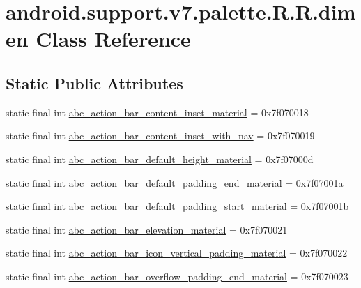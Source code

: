 \hypertarget{classandroid_1_1support_1_1v7_1_1palette_1_1_r_1_1dimen}{
\section{android.support.v7.palette.R.R.dimen Class Reference}
\label{classandroid_1_1support_1_1v7_1_1palette_1_1_r_1_1dimen}
}
\subsection*{Static Public Attributes}
\begin{CompactItemize}
\item 
static final int \hyperlink{classandroid_1_1support_1_1v7_1_1palette_1_1_r_1_1dimen_48d1811da8ed65276c7007c333a06c88}{abc\_\-action\_\-bar\_\-content\_\-inset\_\-material} = 0x7f070018
\item 
static final int \hyperlink{classandroid_1_1support_1_1v7_1_1palette_1_1_r_1_1dimen_d6b40ba08e931550e7b1a23a9da1434a}{abc\_\-action\_\-bar\_\-content\_\-inset\_\-with\_\-nav} = 0x7f070019
\item 
static final int \hyperlink{classandroid_1_1support_1_1v7_1_1palette_1_1_r_1_1dimen_27d9f229ec07b98e85499bee9c4bdf2f}{abc\_\-action\_\-bar\_\-default\_\-height\_\-material} = 0x7f07000d
\item 
static final int \hyperlink{classandroid_1_1support_1_1v7_1_1palette_1_1_r_1_1dimen_664494592b9e469c5c334648ff05fa8a}{abc\_\-action\_\-bar\_\-default\_\-padding\_\-end\_\-material} = 0x7f07001a
\item 
static final int \hyperlink{classandroid_1_1support_1_1v7_1_1palette_1_1_r_1_1dimen_06bde1aef0fafb2981d37e2ec12db113}{abc\_\-action\_\-bar\_\-default\_\-padding\_\-start\_\-material} = 0x7f07001b
\item 
static final int \hyperlink{classandroid_1_1support_1_1v7_1_1palette_1_1_r_1_1dimen_0c3a2dc16c3ad417be488f2d9dc8e987}{abc\_\-action\_\-bar\_\-elevation\_\-material} = 0x7f070021
\item 
static final int \hyperlink{classandroid_1_1support_1_1v7_1_1palette_1_1_r_1_1dimen_37c8bc532c88fa35f7d0615f42123850}{abc\_\-action\_\-bar\_\-icon\_\-vertical\_\-padding\_\-material} = 0x7f070022
\item 
static final int \hyperlink{classandroid_1_1support_1_1v7_1_1palette_1_1_r_1_1dimen_53cf6638b50159e07c33378fb7359cbd}{abc\_\-action\_\-bar\_\-overflow\_\-padding\_\-end\_\-material} = 0x7f070023

\end{CompactItemize}
